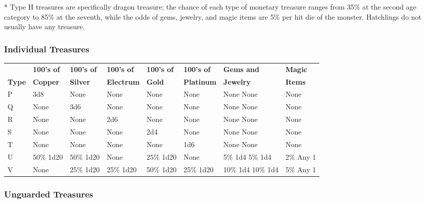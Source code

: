 \documentclass[a4paper,twoside,openany,10pt]{book}
\begin{document}
* Type H treasures are specifically dragon treasure; the chance of each type of monetary treasure ranges from 35\% at the second age category to 85\% at the seventh,  while the odds of gems, jewelry, and magic items are 5\% per hit die of the monster. Hatchlings do not usually have any treasure.

\subsubsection{Individual Treasures}\label{individual-treasures}

\begin{tabular*}{0.97\linewidth}{@{\extracolsep{\fill}}llllllll}
&\textbf{100's of}&\textbf{100's of}&\textbf{100's of}&\textbf{100's of}&\textbf{100's of}&\textbf{Gems and}&\textbf{Magic}\\
\textbf{Type} & \textbf{Copper} & \textbf{Silver} & \textbf{Electrum} & \textbf{Gold} & \textbf{Platinum} & \textbf{Jewelry} & \textbf{Items} \\\toprule
P & 3d8  & None & None & None & None & None None & None\\\hline
Q & None & 3d6 & None & None & None  & None None  &  None \\\hline
R & None & None & 2d6 & None & None  & None None  &  None \\\hline
S & None & None & None & 2d4 & None & None None  & None \\\hline
T &  None & None & None & None & 1d6 & None None & None \\\hline
U & 50\% 1d20  & 50\% 1d20 & None & 25\% 1d20 & None & 5\% 1d4 5\% 1d4 & 2\% Any 1 \\\hline
V & None & 25\% 1d20 & 25\% 1d20 & 50\% 1d20 & 25\% 1d20 & 10\% 1d4 10\% 1d4 & 5\% Any 1 \\\bottomrule
\end{tabular*}

\subsubsection{Unguarded Treasures}\label{unguarded-treasures}
\end{document}
